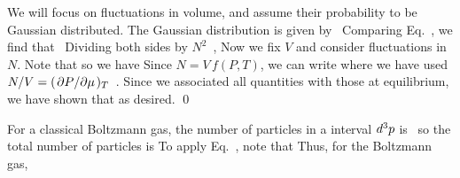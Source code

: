 {	We will focus on fluctuations in volume, and assume their probability to be Gaussian distributed.  The Gaussian distribution is given by~\cite[p.~345]{Landau}
	Comparing Eq.~, we find that~\cite[p.~350]{Landau}
	Dividing both sides by $N^2$~\cite[p.~351]{Landau},
	Now we fix $V$ and consider fluctuations in $N$.  Note that
	so we have
	Since $N = V \,f(P, T)$, we can write
	where we have used $N / V = (\pdv*{P}{\mu})_T$~\cite[pp.~351--352]{Landau}.  Since we associated all quantities with those at equilibrium, we have shown that
	as desired. \qed
	
	For a classical Boltzmann gas, the number of particles in a interval $\dd[3]{p}$ is~\cite[pp.~108--109]{Landau}
	so the total number of particles is
	To apply Eq.~, note that
	Thus, for the Boltzmann gas,
	
}
